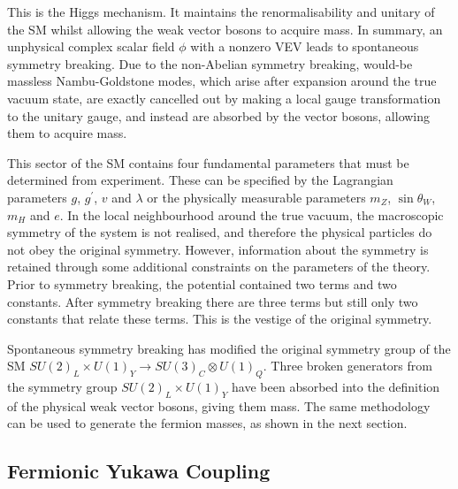 This is the Higgs mechanism.
It maintains the renormalisability and unitary of the SM whilst allowing the weak vector bosons to acquire mass.
In summary, an unphysical complex scalar field $\phi$ with a nonzero VEV leads to spontaneous symmetry breaking.
Due to the non-Abelian symmetry breaking, would\nobreakdash-be massless Nambu-Goldstone modes, which arise after expansion around the true vacuum state, are exactly cancelled out by making a local gauge transformation to the unitary gauge, and instead are absorbed by the vector bosons, allowing them to acquire mass.

This sector of the SM contains four fundamental parameters that must be determined from experiment.
These can be specified by the Lagrangian parameters $g$, $g^\prime$, $v$ and $\lambda$ or the physically measurable parameters $m_Z$, $\sin\theta_W$, $m_H$ and $e$.
In the local neighbourhood around the true vacuum, the macroscopic symmetry of the system is not realised, and therefore the physical particles do not obey the original symmetry. 
However, information about the symmetry is retained through some additional constraints on the parameters of the theory.
Prior to symmetry breaking, the potential contained two terms and two constants. After symmetry breaking there are three terms but still only two constants that relate these terms. This is the vestige of the original symmetry. %

Spontaneous symmetry breaking has modified the original symmetry group of the SM $SU(2)_L \times U(1)_Y \rightarrow SU(3)_C \otimes U(1)_Q$.
Three broken generators from the symmetry group $SU(2)_L \times U(1)_Y$ have been absorbed into the definition of the physical weak vector bosons, giving them mass.
The same methodology can be used to generate the fermion masses, as shown in the next section. 



\subsection{Fermionic Yukawa Coupling}\label{sec:higgs_yukawa_coupling}

